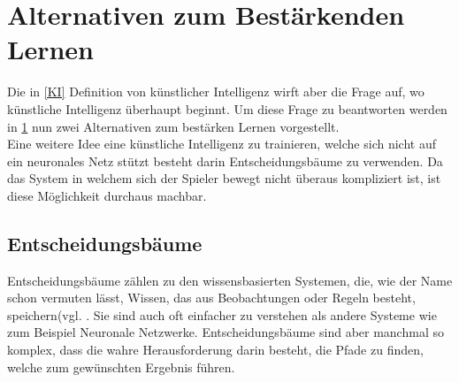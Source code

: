 
\chapter{Alternativen zum Bestärkenden Lernen}\label{AL}
Die in \ref{KI} Definition von künstlicher Intelligenz wirft aber die Frage auf, wo künstliche Intelligenz überhaupt beginnt. Um diese Frage zu beantworten  werden in \ref{AL} nun zwei Alternativen zum bestärken Lernen vorgestellt.\\
Eine weitere Idee eine künstliche Intelligenz zu trainieren, welche sich nicht auf ein neuronales Netz stützt besteht darin Entscheidungsbäume zu verwenden. Da das System in welchem sich der Spieler bewegt nicht überaus kompliziert ist, ist diese Möglichkeit durchaus machbar.
\section{Entscheidungsbäume}
Entscheidungsbäume zählen zu den wissensbasierten Systemen, die, wie der Name schon vermuten lässt, Wissen, das aus Beobachtungen oder Regeln besteht, speichern(vgl. \cite[vgl.][S.81-82]{quinlan1986induction}. Sie sind auch oft einfacher zu verstehen als andere Systeme wie zum Beispiel Neuronale Netzwerke. Entscheidungsbäume sind aber manchmal so komplex, dass die wahre Herausforderung darin besteht, die Pfade zu finden, welche zum gewünschten Ergebnis führen.
\label{EB}
